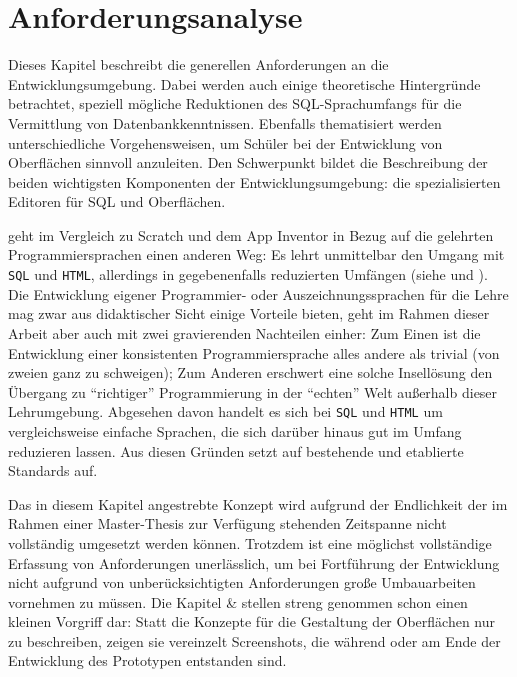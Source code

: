 \section{Anforderungsanalyse}
\label{sec:requirements}

Dieses Kapitel beschreibt die generellen Anforderungen an die Entwicklungsumgebung. Dabei werden auch einige theoretische Hintergründe betrachtet, speziell mögliche Reduktionen des SQL-Sprachumfangs für die Vermittlung von Datenbankkenntnissen. Ebenfalls thematisiert werden unterschiedliche Vorgehensweisen, um Schüler bei der Entwicklung von Oberflächen sinnvoll anzuleiten. Den Schwerpunkt bildet die Beschreibung der beiden wichtigsten Komponenten der Entwicklungsumgebung: die spezialisierten Editoren für SQL und Oberflächen.


\idename{} geht im Vergleich zu Scratch und dem App Inventor in Bezug auf die gelehrten Programmiersprachen einen anderen Weg: Es lehrt unmittelbar den Umgang mit \texttt{SQL} und \texttt{HTML}, allerdings in gegebenenfalls reduzierten Umfängen (siehe  und ). Die Entwicklung eigener Programmier- oder Auszeichnungssprachen für die Lehre mag zwar aus didaktischer Sicht einige Vorteile bieten, geht im Rahmen dieser Arbeit aber auch mit zwei gravierenden Nachteilen einher: Zum Einen ist die Entwicklung einer konsistenten Programmiersprache alles andere als trivial (von zweien ganz zu schweigen); Zum Anderen erschwert eine solche Insellösung den Übergang zu "`richtiger"' Programmierung in der "`echten"' Welt außerhalb dieser Lehrumgebung. Abgesehen davon handelt es sich bei \texttt{SQL} und \texttt{HTML} um vergleichsweise einfache Sprachen, die sich darüber hinaus gut im Umfang reduzieren lassen. Aus diesen Gründen setzt \idename{} auf bestehende und etablierte Standards auf.

Das in diesem Kapitel angestrebte Konzept wird aufgrund der Endlichkeit der im Rahmen einer Master-Thesis zur Verfügung stehenden Zeitspanne nicht vollständig umgesetzt werden können. Trotzdem ist eine möglichst vollständige Erfassung von Anforderungen unerlässlich, um bei Fortführung der Entwicklung nicht aufgrund von unberücksichtigten Anforderungen große Umbauarbeiten vornehmen zu müssen. Die Kapitel  \&  stellen streng genommen schon einen kleinen Vorgriff dar: Statt die Konzepte für die Gestaltung der Oberflächen nur zu beschreiben, zeigen sie vereinzelt Screenshots, die während oder am Ende der Entwicklung des Prototypen entstanden sind.

